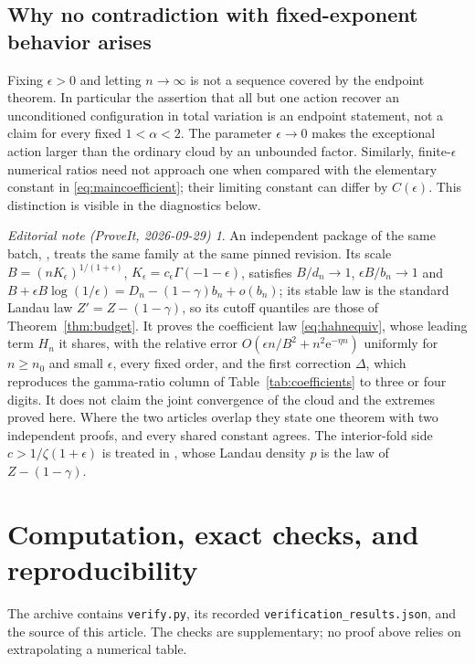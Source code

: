 \documentclass[11pt,a4paper]{article}
\numberwithin{equation}{section}
\theoremstyle{definition}
\theoremstyle{remark}
\newtheorem*{ednote}{Editorial note (ProveIt, 2026-09-29)}
\newcommand{\ee}{\epsilon}
\begin{document}
\subsection{Why no contradiction with fixed-exponent behavior arises}
Fixing $\ee>0$ and letting $n\to\infty$ is not a sequence covered by the
endpoint theorem. In particular the assertion that all but one action
recover an unconditioned configuration in total variation is an endpoint
statement, not a claim for every fixed $1<\alpha<2$. The parameter
$\ee\to0$ makes the exceptional action larger than the ordinary cloud by
an unbounded factor. Similarly, finite-$\ee$ numerical ratios need not
approach one when compared with the elementary constant in
\eqref{eq:maincoefficient}; their limiting constant can differ by
$C(\ee)$. This distinction is visible in the diagnostics below.
\begin{ednote}
An independent package of the same batch,
,
treats the same family at the same pinned revision. Its scale
$B=(nK_\ee)^{1/(1+\ee)}$, $K_\ee=c_\ee\Gamma(-1-\ee)$, satisfies
$B/d_n\to1$, $\ee B/b_n\to1$ and
$B+\ee B\log(1/\ee)=D_n-(1-\gamma)b_n+o(b_n)$; its stable law is the
standard Landau law $Z'=Z-(1-\gamma)$, so its cutoff quantiles are those of
Theorem~\ref{thm:budget}. It proves the coefficient law
\eqref{eq:hahnequiv}, whose leading term $H_n$ it shares, with the relative error
$O(\ee n/B^2+n^2\mathrm e^{-\eta n})$ uniformly for $n\ge n_0$ and small
$\ee$, every fixed order, and the first correction $\Delta$, which
reproduces the gamma-ratio column of Table~\ref{tab:coefficients} to three
or four digits. It does not claim the joint convergence of the cloud and
the extremes proved here. Where the two articles overlap they state one
theorem with two independent proofs, and every shared constant agrees. The
interior-fold side $c>1/\zeta(1+\ee)$ is treated in
, whose Landau density
$p$ is the law of $Z-(1-\gamma)$.
\end{ednote}

\section{Computation, exact checks, and reproducibility}
\label{sec:computations}
The archive contains \texttt{verify.py}, its recorded
\texttt{verification\_results.json}, and the source of this article.
The checks are supplementary; no proof above relies on extrapolating a
numerical table.
\end{document}
